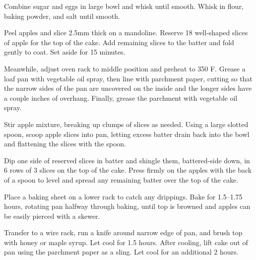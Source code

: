 \documentclass[oneside]{book}  %
\newcommand{\degF}{\textdegree F\xspace}
\begin{document}
\begin{directions}
  \item Combine sugar and eggs in large bowl and whisk until smooth. Whisk in
    flour, baking powder, and salt until smooth.

  \item Peel apples and slice 2.5mm thick on a mandoline. Reserve 18 well-shaped
    slices of apple for the top of the cake. Add remaining slices to the batter
    and fold gently to coat. Set aside for 15 minutes.

  \item Meanwhile, adjust oven rack to middle position and preheat to 350 \degF.
    Grease a loaf pan with vegetable oil spray, then line with parchment paper,
    cutting so that the narrow sides of the pan are uncovered on the inside and
    the longer sides have a couple inches of overhang. Finally, grease the
    parchment with vegetable oil spray.

  \item Stir apple mixture, breaking up clumps of slices as needed. Using a
    large slotted spoon, scoop apple slices into pan, letting excess batter
    drain back into the bowl and flattening the slices with the spoon.

  \item Dip one side of reserved slices in batter and shingle them,
    battered-side down, in 6 rows of 3 slices on the top of the cake. Press
    firmly on the apples with the back of a spoon to level and spread any
    remaining batter over the top of the cake.

  \item Place a baking sheet on a lower rack to catch any drippings.
    Bake for 1.5--1.75 hours, rotating pan halfway through baking, until top
    is browned and apples can be easily pierced with a skewer.

  \item Transfer to a wire rack, run a knife around narrow edge of pan, and
    brush top with honey or maple syrup. Let cool for 1.5 hours. After cooling,
    lift cake out of pan using the parchment paper as a sling. Let cool for an
    additional 2 hours.
\end{directions}
\end{document}

